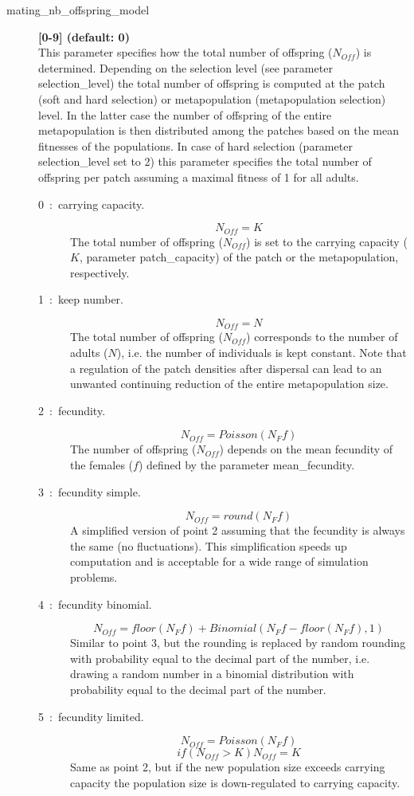 \documentclass[letterpaper,12pt,oneside]{book}
\begin{document}
\begin{description}
\item[mating\_nb\_offspring\_model] \textbf{[0-9] (default: 0)}\\
This parameter specifies how the total number of offspring ($N_{Off}$) is determined. Depending on the selection level (see parameter \textsf{selection\_level}) the total number of offspring is computed at the patch (soft and hard selection) or metapopulation (metapopulation selection) level. In the latter case the number of offspring of the entire metapopulation is then distributed among the patches based on the mean fitnesses of the populations. In case of hard selection (parameter \textsf{selection\_level} set to 2) this parameter specifies the total number of offspring per patch assuming a maximal fitness of 1 for all adults.
\begin{description}
\item [0~:~carrying capacity.]  \[ N_{Off} = K \]
The total number of offspring ($N_{Off}$) is set to the carrying capacity ($K$, parameter \textsf{patch\_capacity}) of the patch or the metapopulation, respectively.
\item [1~:~keep number.] \[ N_{Off} = N \]
The total number of offspring ($N_{Off}$) corresponds to the number of adults ($N$), i.e. the number of individuals is kept constant. Note that a regulation of the patch densities after dispersal can lead to an unwanted continuing reduction of the entire metapopulation size. 
\item [2~:~fecundity.]  \[ N_{Off} = Poisson(N_{F}f) \]
The number of offspring ($N_{Off}$) depends on the mean fecundity of the females ($f$) defined by the parameter \textsf{mean\_fecundity}.
\item [3~:~fecundity simple.] \[ N_{Off} = round(N_{F}f) \]
A simplified version of point 2 assuming that the fecundity is always the same (no fluctuations). This simplification speeds up computation and is acceptable for a wide range of simulation problems.
\item [4~:~fecundity binomial.] \[ N_{Off} = floor(N_{F}f)+Binomial(N_{F}f-floor(N_{F}f),1) \]
Similar to point 3, but the rounding is replaced by random rounding with probability equal to the decimal part of the number, i.e. drawing a random number in a binomial distribution with probability equal to the decimal part of the number.
\item [5~:~fecundity limited.] 
\[ N_{Off}= Poisson(N_{F}f) \]
\[ if(N_{Off}>K) N_{Off}=K \]
Same as point 2, but if the new population size exceeds carrying capacity the population size is down-regulated to carrying capacity.

\end{description}
\end{description}
\end{document}
